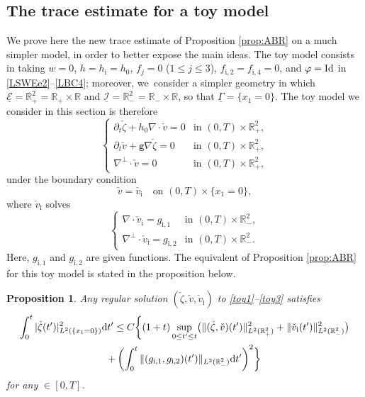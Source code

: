 \documentclass[JEP,XML,SOM,Unicode,NoFloatCountersInSection,published]{cedram}
\newcommand{\gr}{{\mathtt g}}
\newcommand{\R}{{\mathbb R}}
\newcommand{\dt}{\partial_t}
\newcommand{\ul}[1]{\underline{#1}}
\newcommand{\itGamma}{\mathit{\Gamma}}
\newtheorem{proposition}[theorem]{Proposition}
\theoremstyle{definition}
\begin{document}
\subsection{The trace estimate for a toy model}
We prove here the new trace estimate of Proposition \ref{prop:ABR} on a much simpler model, in order to better expose the main ideas.
The toy model consists in taking $w=0$, $h=h_\mathrm{i}=h_0$, $f_j=0$ ($1\leq j\leq 3$), $f_\mathrm{i,2}=f_\mathrm{i,4}=0$,
and $\varphi={\rm Id}$ in \eqref{LSWEe2}--\eqref{LBC4};
moreover, we~consider a simpler geometry in which $\ul{\mathcal E}=\R^2_+=\R_+\times \R$ and $\ul{\mathcal I}=\R^2_-=\R_-\times \R$,
so that $\ul{\itGamma}=\{x_1=0\}$.
The toy model we consider in this section is therefore
\begin{equation}\label{toy1}
\begin{cases}
\dt \check{\zeta}+h_0\nabla\cdot \check{v}=0 &\text{in } (0,T)\times \R^2_+, \\
\dt \check{v}+\gr \nabla \check{\zeta}=0 &\text{in } (0,T)\times \R^2_+, \\
\nabla^\perp\cdot\check{v}=0 &\text{in } (0,T)\times \R^2_+,
\end{cases}
\end{equation}
under the boundary condition
\begin{equation}\label{toy2}
\check{v}=\check{v_\mathrm{i}} \quad\text{on } (0,T)\times \{x_1=0\},
\end{equation}
where $\check{v}_\mathrm{i}$ solves
\begin{equation}\label{toy3}
\begin{cases}
\nabla\cdot \check{v}_\mathrm{i}=g_\mathrm{i,1} &\text{in } (0,T)\times \R^2_-, \\
\nabla^\perp\cdot \check{v}_\mathrm{i}=g_\mathrm{i,2} &\text{in } (0,T)\times \R^2_-.
\end{cases}
\end{equation}
Here, $g_\mathrm{i,1} $ and $g_\mathrm{i,2} $ are given functions.
The equivalent of Proposition \ref{prop:ABR} for this toy model is stated in the proposition below.

\begin{proposition}\label{prop:ABRtoy}
Any regular solution $(\check{\zeta},\check{v}, \check{v}_\mathrm{i})$ to \eqref{toy1}--\eqref{toy3} satisfies
\begin{multline*}
\int_0^t|\check{\zeta}(t')|_{L^2(\{x_1=0\})}^2\mathrm{d}t'
\leq C \biggl\{ (1+t)\sup_{0\leq t'\leq t}\bigl(\|(\check{\zeta},\check{v})(t')\|_{L^2({\R^2_+})}^2
+ \|\check{v}_\mathrm{i}(t')\|_{L^2(\R^2_-)}^2 \bigr) \\
+ \left(\int_0^t
\|(g_{{\rm i},1},g_{{\rm i},2})(t')\|_{L^2(\R^2_-)} {\rm d}t' \right)^2 \biggr\}
\end{multline*}
for any $\in[0,T]$.
\end{proposition}
\end{document}

